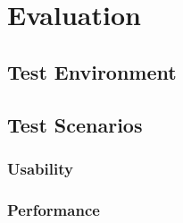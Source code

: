 \chapter{Evaluation\label{cha:chapter6}}

\section{Test Environment\label{sec:eval_te_en}}

\section{Test Scenarios\label{sec:eval__te_sc}}
	\subsection{Usability\label{seq:eval_usab}}
	
	\subsection{Performance\label{seq:eval_perf}}